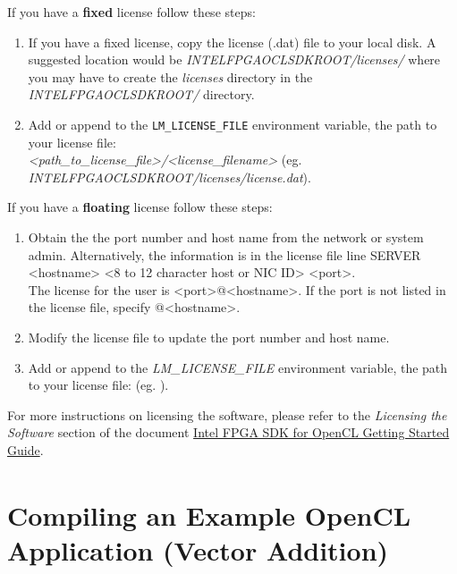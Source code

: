 \documentclass[11pt, twoside, pdftex]{article}
\begin{document}
\label{sec:licensing}
If you have a \textbf{fixed} license follow these steps:
\begin{enumerate}
\item If you have a fixed license, copy the license (.dat) file to your local disk. A suggested location would be \textit{INTELFPGAOCLSDKROOT/licenses/} where you may have to create the \textit{licenses} directory in the \textit{INTELFPGAOCLSDKROOT/} directory.

\item Add or append to the \texttt{LM\_LICENSE\_FILE} environment variable, the path to your license file:\\
\textit{<path\_to\_license\_file>/<license\_filename>} (eg. \textit{INTELFPGAOCLSDKROOT/licenses/license.dat}).
\end{enumerate}

If you have a \textbf{floating} license follow these steps:
\begin{enumerate}
\item Obtain the the port number and host name from the network or system admin. Alternatively, the information is in the license file line \textsf{SERVER <hostname> <8 to 12 character host or NIC ID> <port>}.\\
The license for the user is \textsf{<port>@<hostname>}. If the port is not listed in the license file, specify \textsf{@<hostname>}.

\item Modify the license file to update the port number and host name.

\item Add or append to the \textit{LM\_LICENSE\_FILE} environment variable, the path to your license file:  (eg. ).
\end{enumerate}

For more instructions on licensing the software, please refer to the \textit{Licensing the Software} section of the document \href{https://www.altera.com/documentation/mwh1391807309901.html}{Intel FPGA SDK for OpenCL Getting Started Guide}.

\section{Compiling an Example OpenCL\textsuperscript{\texttrademark} Application (Vector Addition)}
\label{sec:compiling}
\end{document}
